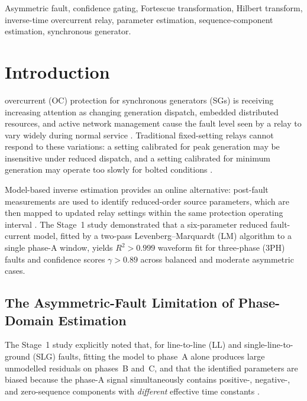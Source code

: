 \documentclass[10pt,journal,twoside]{IEEEtran}
\begin{document}
\begin{IEEEkeywords}
Asymmetric fault, confidence gating, Fortescue transformation, Hilbert
transform, inverse-time overcurrent relay, parameter estimation,
sequence-component estimation, synchronous generator.
\end{IEEEkeywords}

\section{Introduction}
\label{sec:intro}

 overcurrent (OC) protection for synchronous
generators (SGs) is receiving increasing attention as changing generation
dispatch, embedded distributed resources, and active network management
cause the fault level seen by a relay to vary widely during normal service
\cite{Blackburn2006,Sharaf2011,Darlington2021}.  Traditional fixed-setting
relays cannot respond to these variations: a setting calibrated for peak
generation may be insensitive under reduced dispatch, and a setting
calibrated for minimum generation may operate too slowly for bolted
conditions \cite{Anderson1995}.

Model-based inverse estimation provides an online alternative: post-fault
measurements are used to identify reduced-order source parameters, which are
then mapped to updated relay settings within the same protection operating
interval \cite{Eluvathingal2025_TR01}.  The Stage~1 study
\cite{Eluvathingal2025_TR01} demonstrated that a six-parameter
reduced fault-current model, fitted by a two-pass
Levenberg--Marquardt (LM) algorithm to a single phase-A window, yields
$R^2 > 0.999$ waveform fit for three-phase (3PH) faults and confidence
scores $\gamma > 0.89$ across balanced and moderate asymmetric cases.

\subsection{The Asymmetric-Fault Limitation of Phase-Domain Estimation}

The Stage~1 study explicitly noted that, for line-to-line (LL) and
single-line-to-ground (SLG) faults, fitting the model to phase~A alone
produces large unmodelled residuals on phases~B and~C, and that the
identified parameters are biased because the phase-A signal simultaneously
contains positive-, negative-, and zero-sequence components with
\emph{different} effective time constants \cite{Eluvathingal2025_TR01,
Eluvathingal2026_TR02}.
\end{document}
